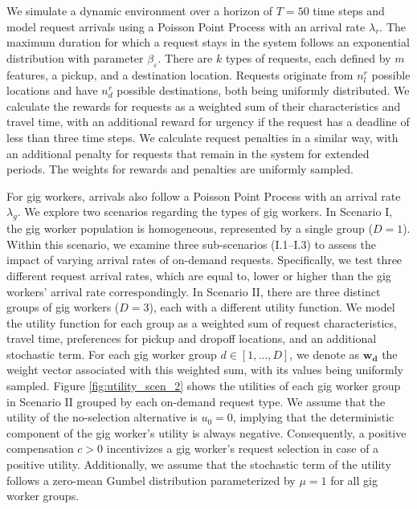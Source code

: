 We simulate a dynamic environment over a horizon of $T = 50$ time steps and model request arrivals using a Poisson Point Process with an arrival rate $\lambda_r$. The maximum duration for which a request stays in the system follows an exponential distribution with parameter $\beta_{\varepsilon}$. There are $k$ types of requests, each defined by $m$ features, a pickup, and a destination location. Requests originate from $n_l^r$ possible locations and have $n_d^r$ possible destinations, both being uniformly distributed. We calculate the rewards for requests as a weighted sum of their characteristics and travel time, with an additional reward for urgency if the request has a deadline of less than three time steps. We calculate request penalties in a  similar way, with an additional penalty for requests that remain in the system for extended periods. The weights for rewards and penalties are uniformly sampled. 

For gig workers, arrivals also follow a Poisson Point Process with an arrival rate $\lambda_g$. We explore two scenarios regarding the types of gig workers. In Scenario I, the gig worker population is homogeneous, represented by a single group ($D = 1$). Within this scenario, we examine three sub-scenarios (I.1–I.3) to assess the impact of varying arrival rates of on-demand requests. Specifically, we test three different request arrival rates, which are equal to, lower or higher than the gig workers' arrival rate correspondingly. In Scenario II, there are three distinct groups of gig workers ($D = 3$), each with a different utility function. We model the utility function for each group as a weighted sum of request characteristics, travel time, preferences for pickup and dropoff locations, and an additional stochastic term. For each gig worker group $d \in [1, \dots, D]$, we denote as $\mathbf{w_d}$ the weight vector associated with this weighted sum, with its values being uniformly sampled. Figure \ref{fig:utility_scen_2} shows the utilities of each gig worker group in Scenario II grouped by each on-demand request type. We assume that the utility of the no-selection alternative is $u_0 = 0$, implying that the deterministic component of the gig worker’s utility is always negative. Consequently, a positive compensation $c > 0$ incentivizes a gig worker's request selection in case of a positive utility. Additionally, we assume that the stochastic term of the utility follows a zero-mean Gumbel distribution parameterized by $\mu=1$ for all gig worker groups. 

